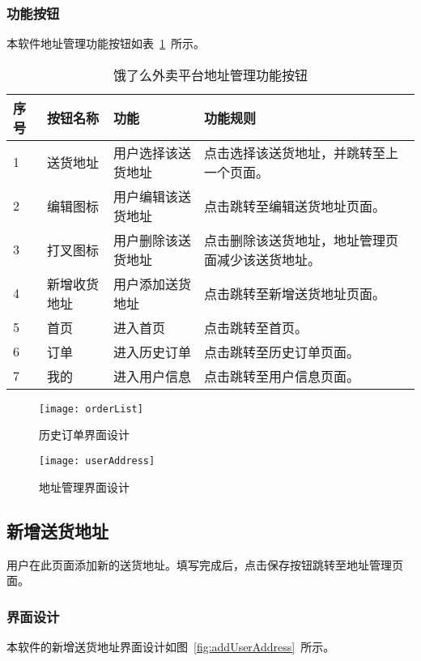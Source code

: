 \subsubsection{功能按钮}
本软件地址管理功能按钮如表~\ref{tab:table10}~所示。
\begin{table}[htbp]
    \caption{饿了么外卖平台地址管理功能按钮}\label{tab:table10}
    \vspace{0.5em}\wuhao
    \begin{tabularx}{\textwidth}{lllX}
    \toprule[1.5pt]
    序号 & 按钮名称 & 功能 & 功能规则 \\ 
    \midrule[1pt]
    1 & 送货地址 & 用户选择该送货地址 & 点击选择该送货地址，并跳转至上一个页面。 \\
    2 & 编辑图标 & 用户编辑该送货地址 & 点击跳转至编辑送货地址页面。 \\
    3 & 打叉图标 & 用户删除该送货地址 & 点击删除该送货地址，地址管理页面减少该送货地址。 \\
    4 & 新增收货地址 & 用户添加送货地址 & 点击跳转至新增送货地址页面。 \\
    5 & 首页 & 进入首页 & 点击跳转至首页。 \\
    6 & 订单 & 进入历史订单 & 点击跳转至历史订单页面。 \\
    7 & 我的 & 进入用户信息 & 点击跳转至用户信息页面。 \\
\bottomrule[1.5pt]
\end{tabularx}
\vspace{\baselineskip}
\end{table}
\begin{figure}[htbp]
    \centering
    \begin{minipage}{0.4\textwidth}
    \centering
    \texttt{[image: orderList]}
    \caption{历史订单界面设计}\label{fig:orderList}
    \end{minipage}
    \begin{minipage}{0.4\textwidth}
    \centering
    \texttt{[image: userAddress]}
    \caption{地址管理界面设计}\label{fig:userAddress}
    \end{minipage}
    \vspace{\baselineskip}
\end{figure}

\subsection{新增送货地址}
用户在此页面添加新的送货地址。填写完成后，点击保存按钮跳转至地址管理页面。
\subsubsection{界面设计}
本软件的新增送货地址界面设计如图~\ref{fig:addUserAddress}~所示。
